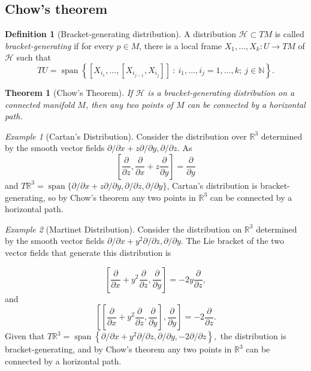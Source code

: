 \documentclass [xcolor=svgnames, t] {beamer}
\theoremstyle{definition}
\newtheorem{df}{Definition}
\theoremstyle{plain}
\newtheorem{thm}{Theorem}
\theoremstyle{remark}
\newtheorem{ex}{Example}
\begin{document}
\subsection{Chow's theorem}
\begin{frame}
	\begin{df}[Bracket-generating distribution]
	A distribution $ \mathcal{H}\subset TM $ is called \textit{bracket-generating} if for every $ p\in M $, there is a local frame $ X_1,\dots,X_k: U \rightarrow {TM} $ of $ \mathcal{H} $ such that 
	$$ TU = \operatorname{span}\left\{ [X_{i_1},\dots,[X_{i_{j-1}},X_{i_j}]]\ : \ i_1,\dots,i_j=1,\dots,k;\ j\in \mathbb{N} \right\}.  $$ 
\end{df}
\begin{thm}[Chow's Theorem]
	If $ \mathcal{H} $ is a bracket-generating distribution on a connected manifold $ M $, then any two points of $ M $ can be connected by a horizontal path.
\end{thm}
\begin{ex}[Cartan's Distribution]\label{ex:cartan_distribution}
	Consider the distribution over $ \mathbb{R}^3 $ determined by the smooth vector fields $ \partial /\partial x + z \partial / \partial y, \partial/\partial z. $ As 
	$$ \left[ \frac{\partial}{\partial z}, \frac{\partial}{\partial x}+z \frac{\partial}{\partial y}    \right] = \frac{\partial}{\partial y}  $$ 
	and $ T \mathbb{R}^3 = \operatorname{span}\{  \partial/\partial x + z \partial / \partial y, \partial/\partial z, \partial/\partial y\} $, Cartan's distribution is bracket-generating, so by Chow's theorem any two points in $ \mathbb{R}^3 $ can be connected by a horizontal path.
\end{ex}
\begin{ex}[Martinet Distribution]
	Consider the distribution on $ \mathbb{R}^3 $ determined by the smooth vector fields $ \partial/\partial x+y^2\partial/\partial z, \partial/\partial y $. The Lie bracket of the two vector fields that generate this distribution is  

	$$ \left[ \frac{\partial }{\partial x} + y^2 \frac{\partial }{\partial z} , \frac{\partial }{\partial y}  \right] =-2y \frac{\partial }{\partial z}, $$ 
	and 
	$$ \left[\left[ \frac{\partial }{\partial x} + y^2 \frac{\partial }{\partial z} , \frac{\partial }{\partial y}  \right], \frac{\partial }{\partial y} \right] = -2 \frac{\partial }{\partial z}.  $$ 
	Given that $ T \mathbb{R}^3 = \operatorname{span} \left\{ \partial/\partial x+ y^2\partial/\partial z, \partial/\partial y, -2\partial/\partial z \right\},  $ the distribution is bracket-generating, and by Chow's theorem any two points in $ \mathbb{R}^3 $ can be connected by a horizontal path. 
\end{ex}
\end{frame}
\end{document}
